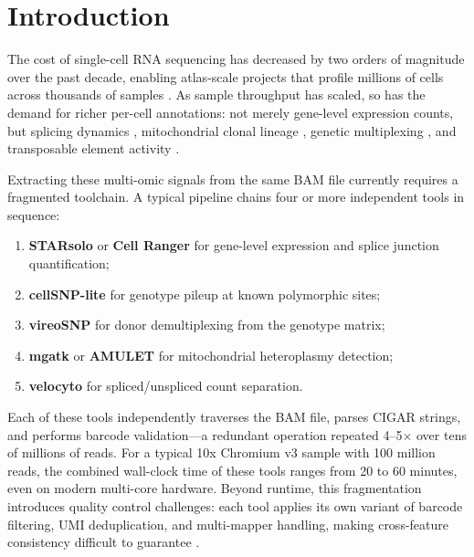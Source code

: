 \documentclass[11pt,a4paper]{article}
\begin{document}
\section{Introduction}

The cost of single-cell RNA sequencing has decreased by two orders of magnitude over the past decade, enabling atlas-scale projects that profile millions of cells across thousands of samples \citep{regev2017human, rozenblatt2017human}.
As sample throughput has scaled, so has the demand for richer per-cell annotations: not merely gene-level expression counts, but splicing dynamics \citep{la2018rna}, mitochondrial clonal lineage \citep{ludwig2019lineage, lareau2021mgatk}, genetic multiplexing \citep{huang2019vireo, xu2019demuxlet}, and transposable element activity \citep{he2021transposable}.

Extracting these multi-omic signals from the same BAM file currently requires a fragmented toolchain. A typical pipeline chains four or more independent tools in sequence:

\begin{enumerate}
    \item \textbf{STARsolo} \citep{dobin2013star, kaminow2021starsolo} or \textbf{Cell Ranger} \citep{zheng2017massively} for gene-level expression and splice junction quantification;
    \item \textbf{cellSNP-lite} \citep{huang2021cellsnp} for genotype pileup at known polymorphic sites;
    \item \textbf{vireoSNP} \citep{huang2019vireo} for donor demultiplexing from the genotype matrix;
    \item \textbf{mgatk} \citep{lareau2021mgatk} or \textbf{AMULET} for mitochondrial heteroplasmy detection;
    \item \textbf{velocyto} \citep{la2018rna} for spliced/unspliced count separation.
\end{enumerate}

Each of these tools independently traverses the BAM file, parses CIGAR strings, and performs barcode validation---a redundant operation repeated 4--5$\times$ over tens of millions of reads.
For a typical 10x Chromium v3 sample with 100 million reads, the combined wall-clock time of these tools ranges from 20 to 60 minutes, even on modern multi-core hardware.
Beyond runtime, this fragmentation introduces quality control challenges: each tool applies its own variant of barcode filtering, UMI deduplication, and multi-mapper handling, making cross-feature consistency difficult to guarantee \citep{svensson2020quantifying, you2021benchmarking}.
\end{document}
